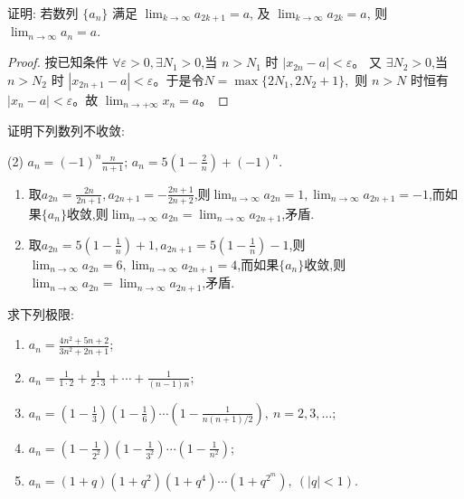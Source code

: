 \begin{exercise}[1.2.6]
    证明: 若数列 $\{a_n\}$ 满足 $\lim_{k\to\infty} a_{2k+1} = a$, 及 $\lim_{k\to\infty} a_{2k} = a$, 则 $\lim_{n\to\infty} a_n = a$.
\end{exercise}

\begin{proof}
    按已知条件 \(\forall \varepsilon > 0, \exists N_1 > 0\),当 \(n > N_1\) 时 \(|x_{2n} - a| < \varepsilon\)。
    又 \(\exists N_2 > 0\),当 \(n > N_2\) 时 \(|x_{2n+1} - a| < \varepsilon\)。于是令\( N = \max\{2N_1, 2N_2 + 1\}, \)
    则 \(n > N\) 时恒有 \(|x_n - a| < \varepsilon\)。故 \(\lim_{n \to +\infty} x_n = a\)。

\end{proof}

\begin{exercise}[1.2.7]
    证明下列数列不收敛:
    \begin{tasks}[label=(\arabic*)](2)
        \task $a_n = (-1)^n \frac{n}{n+1}$;
        \task $a_n = 5 \left(1 - \frac{2}{n}\right) + (-1)^n$.
    \end{tasks}
\end{exercise}

\begin{solution}
    \begin{enumerate}[(1)]
        \item 取$a_{2n} = \frac{2n}{2n+1}, a_{2n+1} = -\frac{2n+1}{2n+2}$,则$\lim_{n \to \infty} a_{2n} = 1, \lim_{n \to \infty} a_{2n+1} = -1$,而如果$\{a_n\}$收敛,则$\lim_{n \to \infty} a_{2n} = \lim_{n \to \infty} a_{2n+1}$,矛盾.
        \item 取$a_{2n} = 5 \left(1 - \frac{1}{n}\right)+1, a_{2n+1} = 5 \left(1 - \frac{1}{n}\right)-1$,则$\lim_{n \to \infty} a_{2n} = 6, \lim_{n \to \infty} a_{2n+1} = 4$,而如果$\{a_n\}$收敛,则$\lim_{n \to \infty} a_{2n} = \lim_{n \to \infty} a_{2n+1}$,矛盾.
    \end{enumerate}
\end{solution}


\begin{exercise}[1.2.8]
    求下列极限:
    \begin{enumerate}[(1)]
        \item $a_n = \frac{4n^2 + 5n + 2}{3n^2 + 2n + 1}$;
        \item $a_n = \frac{1}{1 \cdot 2} + \frac{1}{2 \cdot 3} + \cdots + \frac{1}{(n-1)n}$;
        \item $a_n = \left(1 - \frac{1}{3}\right) \left(1 - \frac{1}{6}\right) \cdots \left(1 - \frac{1}{n(n+1)/2}\right), \ n=2, 3, \ldots$;
        \item $a_n = \left(1 - \frac{1}{2^2}\right) \left(1 - \frac{1}{3^2}\right) \cdots \left(1 - \frac{1}{n^2}\right)$;
        \item $a_n = (1+q)(1+q^2)(1+q^4) \cdots (1+q^{2^m}), \ (|q|<1)$.
    \end{enumerate}
\end{exercise}

